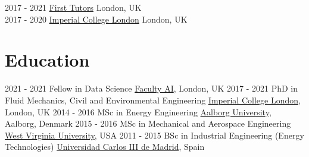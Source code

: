 \documentclass[print]{cv-style}          %
\begin{document}
\begin{entrylist}
\vspace{-0.3cm} %
\entry
  {2017 - 2021}
  {\href{https://www.firsttutors.com/uk/}{First Tutors}}
  {London, UK}
  {
  \\
  }
\vspace{-0.3cm} %
\entry
  {2017 - 2020}
  {\href{https://www.imperial.ac.uk/}{Imperial College London}}
  {London, UK}
  {
  \\
  }
\end{entrylist}
\vspace{-0.4cm}
\section{Education}
\begin{entrylist}
\vspace{-0.4cm}
\entry
{2021 - 2021}
{Fellow in Data Science}
{\href{https://faculty.ai/}{Faculty AI}, London, UK}
{\jobtitle{}}
\vspace{-0.3cm}
\entry
{2017 - 2021}
{PhD in Fluid Mechanics, Civil and Environmental Engineering}
{\href{https://www.imperial.ac.uk/}{Imperial College London}, London, UK}
{\jobtitle{}}
\vspace{-0.3cm}
\entry
{2014 - 2016}
{MSc in Energy Engineering}
{\href{https://www.en.aau.dk/}{Aalborg University}, Aalborg, Denmark}
{\jobtitle{}}
\vspace{-0.3cm}
\entry
{2015 - 2016}
{MSc in Mechanical and Aerospace Engineering}
{\href{https://www.wvu.edu/}{West Virginia University}, USA}
{\jobtitle{}}
\vspace{-0.3cm}
\entry
{2011 - 2015}
{BSc in Industrial Engineering (Energy Technologies)}
{\href{https://www.uc3m.es/}{Universidad Carlos III de Madrid}, Spain}
{\jobtitle{}}
\end{entrylist}
\vspace{-0.4cm}
\end{document}

